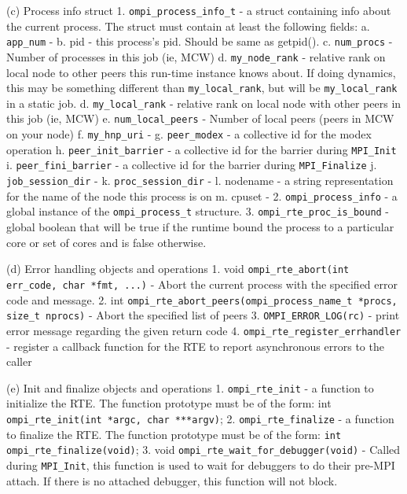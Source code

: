  (c) Process info struct
     1. \verb|ompi_process_info_t| - a struct containing info about the current process.
        The struct must contain at least the following fields:
           a. \verb|app_num| -
           b. pid - this process's pid.  Should be same as getpid().
           c. \verb|num_procs| - Number of processes in this job (ie, MCW)
           d. \verb|my_node_rank| - relative rank on local node to other peers this run-time instance knows about.  If doing dynamics, this may be something different than \verb|my_local_rank|, but will be \verb|my_local_rank| in a static job.
           d. \verb|my_local_rank| - relative rank on local node with other peers in this job (ie, MCW)
           e. \verb|num_local_peers| - Number of local peers (peers in MCW on your node)
           f. \verb|my_hnp_uri| -
           g. \verb|peer_modex| - a collective id for the modex operation
           h. \verb|peer_init_barrier| - a collective id for the barrier during \verb|MPI_Init|
           i. \verb|peer_fini_barrier| - a collective id for the barrier during \verb|MPI_Finalize|
           j. \verb|job_session_dir| -
           k. \verb|proc_session_dir| -
           l. nodename - a string representation for the name of the node this
              process is on
           m. cpuset -
     2. \verb|ompi_process_info| - a global instance of the \verb|ompi_process_t| structure.
     3. \verb|ompi_rte_proc_is_bound| - global boolean that will be true if the runtime bound the process to a particular core or set of cores and is false otherwise.

 (d) Error handling objects and operations
     1. void \verb|ompi_rte_abort(int err_code, char *fmt, ...)| - Abort the current process with the specified error code and message.
     2. int \verb|ompi_rte_abort_peers(ompi_process_name_t *procs, size_t nprocs)| -
        Abort the specified list of peers
     3. \verb|OMPI_ERROR_LOG(rc)| - print error message regarding the given return code
     4. \verb|ompi_rte_register_errhandler| - register a callback function for the RTE to report asynchronous errors to the caller

 (e) Init and finalize objects and operations
     1. \verb|ompi_rte_init| - a function to initialize the RTE. The function
        prototype must be of the form:
        int \verb|ompi_rte_init(int *argc, char ***argv)|;
     2. \verb|ompi_rte_finalize| - a function to finalize the RTE. The function
        prototype must be of the form:
        \verb|int ompi_rte_finalize(void)|;
     3. void \verb|ompi_rte_wait_for_debugger(void)| - Called during \verb|MPI_Init|, this function is used to wait for debuggers to do their pre-MPI attach.
        If there is no attached debugger, this function will not block.

